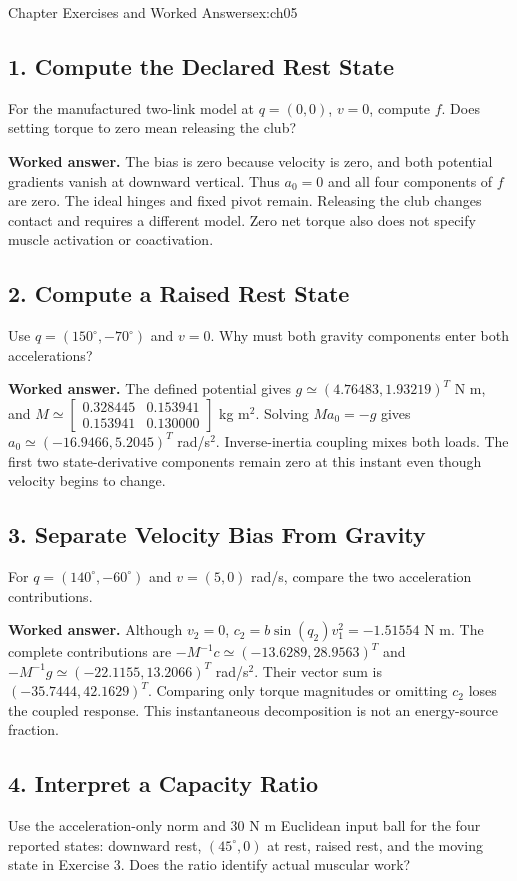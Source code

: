 \begin{exercises}{Chapter Exercises and Worked Answers}{ex:ch05}
\subsection*{1. Compute the Declared Rest State}
For the manufactured two-link model at $q=(0,0)$, $v=0$, compute $f$. Does setting torque to zero mean releasing the club?

\textbf{Worked answer.} The bias is zero because velocity is zero, and both potential gradients vanish at downward vertical. Thus $a_0=0$ and all four components of $f$ are zero. The ideal hinges and fixed pivot remain. Releasing the club changes contact and requires a different model. Zero net torque also does not specify muscle activation or coactivation.

\subsection*{2. Compute a Raised Rest State}
Use $q=(150^\circ,-70^\circ)$ and $v=0$. Why must both gravity components enter both accelerations?

\textbf{Worked answer.} The defined potential gives $g\simeq(4.76483,1.93219)^T$ N m, and $M\simeq\left[\begin{smallmatrix}0.328445&0.153941\\0.153941&0.130000\end{smallmatrix}\right]$ kg m$^2$. Solving $Ma_0=-g$ gives $a_0\simeq(-16.9466,5.2045)^T$ rad/s$^2$. Inverse-inertia coupling mixes both loads. The first two state-derivative components remain zero at this instant even though velocity begins to change.

\subsection*{3. Separate Velocity Bias From Gravity}
For $q=(140^\circ,-60^\circ)$ and $v=(5,0)$ rad/s, compare the two acceleration contributions.

\textbf{Worked answer.} Although $v_2=0$, $c_2=b\sin(q_2)v_1^2=-1.51554$ N m. The complete contributions are $-M^{-1}c\simeq(-13.6289,28.9563)^T$ and $-M^{-1}g\simeq(-22.1155,13.2066)^T$ rad/s$^2$. Their vector sum is $(-35.7444,42.1629)^T$. Comparing only torque magnitudes or omitting $c_2$ loses the coupled response. This instantaneous decomposition is not an energy-source fraction.

\subsection*{4. Interpret a Capacity Ratio}
Use the acceleration-only norm and 30 N m Euclidean input ball for the four reported states: downward rest, $(45^\circ,0)$ at rest, raised rest, and the moving state in Exercise 3. Does the ratio identify actual muscular work?


\end{exercises}

